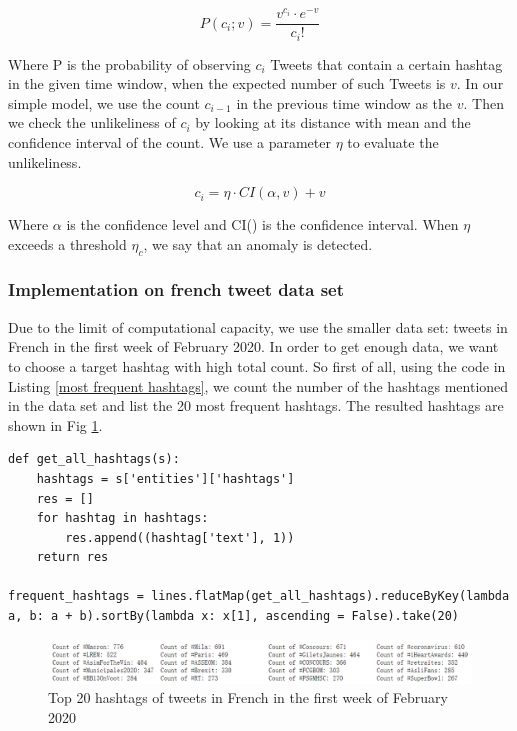 \[P(c_i;v) = \frac{v^{c_i}\cdot e^{-v}}{c_i !}\] 

Where P is the probability of observing $c_i$ Tweets that contain a certain hashtag in the given time window, when the expected number of such Tweets is $v$. In our simple model, we use the count $c_{i-1}$ in the previous time window as the $v$. Then we check the unlikeliness of $c_i$ by looking at its distance with mean and the confidence interval of the count. We use a parameter $\eta$ to evaluate the unlikeliness.

\[c_i = \eta \cdot CI(\alpha, v) + v\]

Where $\alpha$ is the confidence level and CI() is the confidence interval. When $\eta$ exceeds a threshold $\eta_c$, we say that an anomaly is detected.

\subsubsection{Implementation on french tweet data set}
\label{implement}

Due to the limit of computational capacity, we use the smaller data set: tweets in French in the first week of February 2020. In order to get enough data, we want to choose a target hashtag with high total count. So first of all, using the code in Listing \ref{most frequent hashtags}, we count the number of the hashtags mentioned in the data set and list the 20 most frequent hashtags. The resulted hashtags are shown in Fig \ref{fig:topHashtag}.

\begin{lstlisting}[caption=Most Frequent hashtags, label={most frequent hashtags}]
def get_all_hashtags(s):
    hashtags = s['entities']['hashtags']
    res = []
    for hashtag in hashtags:
        res.append((hashtag['text'], 1))
    return res

frequent_hashtags = lines.flatMap(get_all_hashtags).reduceByKey(lambda a, b: a + b).sortBy(lambda x: x[1], ascending = False).take(20)
\end{lstlisting}


\begin{figure}[H]
    \centering
    \includegraphics[width=1\textwidth]{images/top10_hashtags.png}
    \caption{Top 20 hashtags of tweets in French in the first week of February 2020}
    \label{fig:topHashtag}
\end{figure}

